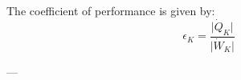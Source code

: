 The coefficient of performance is given by:  
\[
\epsilon_K = \frac{\lvert \dot{Q}_K \rvert}{\lvert \dot{W}_K \rvert}
\]

---